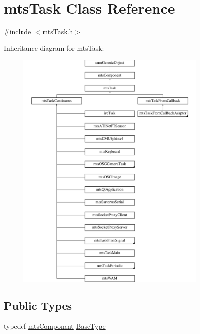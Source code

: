 \hypertarget{classmts_task}{\section{mts\-Task Class Reference}
\label{classmts_task}
}


{\ttfamily \#include $<$mts\-Task.\-h$>$}

Inheritance diagram for mts\-Task\-:\begin{figure}[H]
\begin{center}
\leavevmode
\includegraphics[height=12.000000cm]{d6/d82/classmts_task}
\end{center}
\end{figure}
\subsection*{Public Types}
\begin{DoxyCompactItemize}
\item 
typedef \hyperlink{classmts_component}{mts\-Component} \hyperlink{classmts_task_aac1f3b293b0dc04205b449899c795b80}{Base\-Type}
\end{DoxyCompactItemize}
